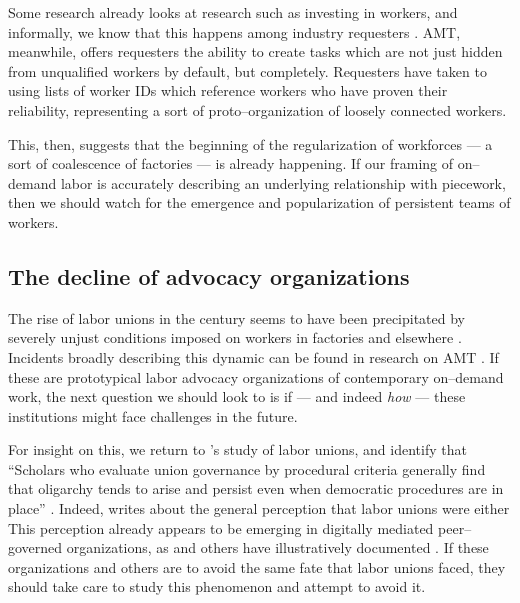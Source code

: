 \documentclass[chi_draft]{sigchi}
\begin{document}
{  Some research already looks at research such as investing in workers, and
  informally, we know that this happens among industry requesters
  \cite{jonBrelig,shepherdingDow}.
  AMT, meanwhile, offers requesters the ability to create tasks which are
  not just hidden from unqualified workers by default, but completely.
  Requesters have taken to using lists of worker IDs which reference
  workers who have proven their reliability,
  representing a sort of proto--organization of loosely connected workers.

  This, then, suggests that the beginning of the regularization of workforces
  --- a sort of coalescence of factories ---
  is already happening.
  If our framing of on--demand labor is accurately describing an underlying relationship with piecework,
  then we should watch for the emergence and popularization of persistent teams of workers.

  \subsection{The decline of advocacy organizations}
  The rise of labor unions in the  century seems to have been precipitated by
  severely unjust conditions imposed on workers in factories and elsewhere
  \cite{ebbinghaus1999institutions}.
  Incidents broadly describing this dynamic can be found in research on AMT
  \cite{turkopticon,dynamo}.
  If these are prototypical labor advocacy organizations of contemporary on--demand work,
  the next question we should look to is if
  --- and indeed \textit{how} ---
  these institutions might face challenges in the future.

  For insight on this, we return to \citeyear{levi2009union}'s study of labor unions,
  and identify that
  ``Scholars who evaluate union governance by procedural criteria generally find that oligarchy tends to arise and persist even when democratic procedures are in place''
  \cite{levi2009union}.
  Indeed, \citeauthor{levi2009union} writes about the general perception that labor unions were either
  This perception already appears to be emerging in digitally mediated peer--governed organizations,
  as \citeauthor{keegan2010egalitarians} and others have illustratively documented
  \cite{beschastnikh2008wikipedian,keegan2010egalitarians}.
  If these organizations and others are to avoid the same fate that labor unions faced,
  they should take care to study this phenomenon and attempt to avoid it.

}
\end{document}
